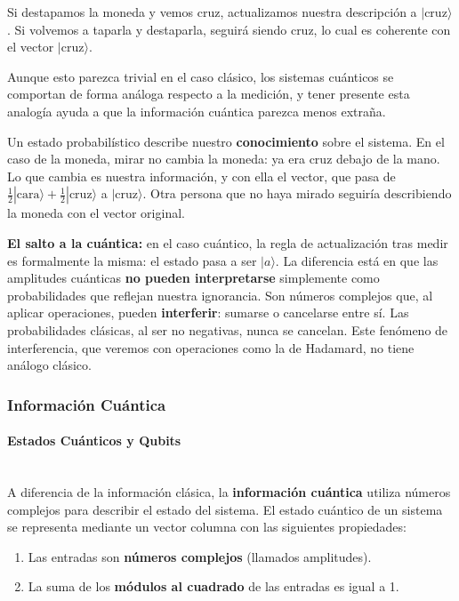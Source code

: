 \documentclass[12pt, a4paper]{article}
\begin{document}
Si destapamos la moneda y vemos cruz, actualizamos nuestra descripción a $|\text{cruz}\rangle$. Si volvemos a taparla y destaparla, seguirá siendo cruz, lo cual es coherente con el vector $|\text{cruz}\rangle$.

Aunque esto parezca trivial en el caso clásico, los sistemas cuánticos se comportan de forma análoga respecto a la medición, y tener presente esta analogía ayuda a que la información cuántica parezca menos extraña.

\begin{tcolorbox}[colback=blue!5!white,colframe=blue!75!black,title=\textbf{Aclaración: El cambio de estado tras la medición}]
Un estado probabilístico describe nuestro \textbf{conocimiento} sobre el sistema. En el caso de la moneda, mirar no cambia la moneda: ya era cruz debajo de la mano. Lo que cambia es nuestra información, y con ella el vector, que pasa de $\frac{1}{2}|\text{cara}\rangle + \frac{1}{2}|\text{cruz}\rangle$ a $|\text{cruz}\rangle$. Otra persona que no haya mirado seguiría describiendo la moneda con el vector original.

\textbf{El salto a la cuántica:} en el caso cuántico, la regla de actualización tras medir es formalmente la misma: el estado pasa a ser $|a\rangle$. La diferencia está en que las amplitudes cuánticas \textbf{no pueden interpretarse} simplemente como probabilidades que reflejan nuestra ignorancia. Son números complejos que, al aplicar operaciones, pueden \textbf{interferir}: sumarse o cancelarse entre sí. Las probabilidades clásicas, al ser no negativas, nunca se cancelan. Este fenómeno de interferencia, que veremos con operaciones como la de Hadamard, no tiene análogo clásico.
\end{tcolorbox}

\subsubsection{Información Cuántica}

\paragraph{Estados Cuánticos y Qubits}\mbox{}\\

\noindent A diferencia de la información clásica, la \textbf{información cuántica} utiliza números complejos para describir el estado del sistema. El estado cuántico de un sistema se representa mediante un vector columna con las siguientes propiedades:
\begin{enumerate}
    \item Las entradas son \textbf{números complejos} (llamados amplitudes).
    \item La suma de los \textbf{módulos al cuadrado} de las entradas es igual a 1.
\end{enumerate}
\end{document}
